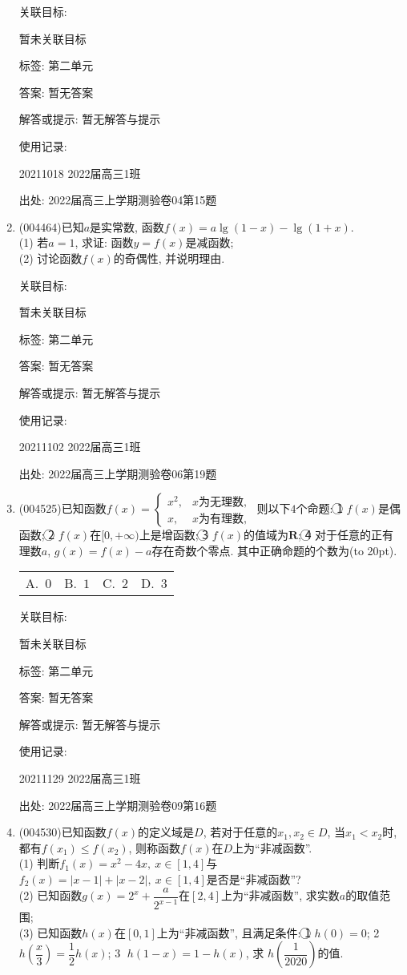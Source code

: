 \documentclass[10pt,a4paper]{article}
\newcommand{\bracket}[1]{(\hbox to #1pt{})}
\newcommand{\fourch}[4]{\par\begin{tabular}{p{.23\textwidth}p{.23\textwidth}p{.23\textwidth}p{.23\textwidth}}
A.~#1 &B.~#2& C.~#3& D.~#4
\end{tabular}}
\begin{document}
\begin{enumerate}[1.]
关联目标:

暂未关联目标



标签: 第二单元

答案: 暂无答案

解答或提示: 暂无解答与提示

使用记录:

20211018	2022届高三1班		


出处: 2022届高三上学期测验卷04第15题
\item { (004464)}已知$a$是实常数, 函数$f(x)=a\lg(1-x)-\lg (1+x)$.\\
(1) 若$a=1$, 求证: 函数$y=f(x)$是减函数;\\
(2) 讨论函数$f(x)$的奇偶性, 并说明理由.


关联目标:

暂未关联目标



标签: 第二单元

答案: 暂无答案

解答或提示: 暂无解答与提示

使用记录:

20211102	2022届高三1班		


出处: 2022届高三上学期测验卷06第19题
\item { (004525)}已知函数$f(x)=\begin{cases} x^2, & x\text{为无理数}, \\ x, &x\text{为有理数},   \end{cases}$ 则以下$4$个命题:
\textcircled{1} $f(x)$是偶函数; \textcircled{2} $f(x)$在$[0,+\infty)$上是增函数; \textcircled{3} $f(x)$的值域为$\mathbf{R}$; \textcircled{4} 对于任意的正有理数$a$, $g(x)=f(x)-a$存在奇数个零点.
其中正确命题的个数为\bracket{20}.
\fourch{$0$}{$1$}{$2$}{$3$}


关联目标:

暂未关联目标



标签: 第二单元

答案: 暂无答案

解答或提示: 暂无解答与提示

使用记录:

20211129	2022届高三1班	


出处: 2022届高三上学期测验卷09第16题
\item { (004530)}已知函数$f(x)$的定义域是$D$, 若对于任意的$x_1,x_2\in D$, 当$x_1<x_2$时, 都有$f(x_1)\le f(x_2)$, 则称函数$f(x)$在$D$上为``非减函数''.\\
(1) 判断$f_1(x)=x^2-4x, \ x\in [1,4]$与$f_2(x)=|x-1|+|x-2|, \ x\in [1,4]$是否是``非减函数''?\\
(2) 已知函数$g(x)=2^x+\dfrac a{2^{x-1}}$在$[2,4]$上为``非减函数'', 求实数$a$的取值范围;\\
(3) 已知函数$h(x)$在$[0,1]$上为``非减函数'', 且满足条件:
\textcircled{1}  $h(0)=0$; \textcircled{2}  $h(\dfrac x3)=\dfrac 12h(x)$; \textcircled{3}  $h(1-x)=1-h(x)$, 求 $h(\dfrac 1{2020})$的值.



\end{enumerate}
\end{document}
